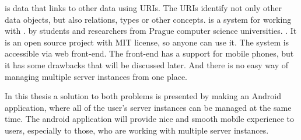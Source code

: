 \ld{}  is data that links to other data using URIs.
The URIs identify not only other data objects, but also relations, types or other concepts.
\etl{} is a system for working with \ld{}.
  by students and researchers from Prague computer science universities.
.
It is an open source project \cite{etl} with MIT license, so anyone can use it.
The system is accessible via web front-end.
The front-end has a support for mobile phones, but it has some drawbacks that will be discussed later.
 And there is no easy way of managing multiple server instances from one place.

In this thesis a solution to both problems is presented by making an Android application, where all of the user's \etl{} server instances can be managed at the same time.
The android application will provide nice and smooth mobile experience to \etl{} users, especially to those, who are working with multiple server instances.

